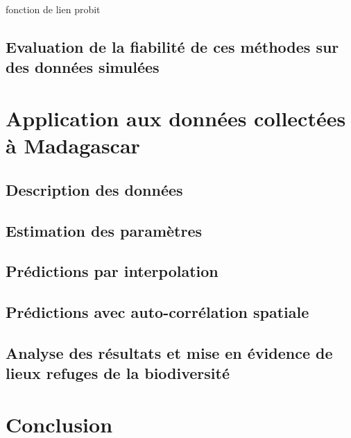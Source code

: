 \documentclass[10pt,]{article}
\begin{document}
fonction de lien probit

\hypertarget{evaluation-de-la-fiabilite-de-ces-methodes-sur-des-donnees-simulees}{%
\subsection{Evaluation de la fiabilité de ces méthodes sur des données
simulées}\label{evaluation-de-la-fiabilite-de-ces-methodes-sur-des-donnees-simulees}}

\hypertarget{application-aux-donnees-collectees-a-madagascar}{%
\section{Application aux données collectées à
Madagascar}\label{application-aux-donnees-collectees-a-madagascar}}

\hypertarget{description-des-donnees}{%
\subsection{Description des données}\label{description-des-donnees}}

\hypertarget{estimation-des-parametres}{%
\subsection{Estimation des paramètres}\label{estimation-des-parametres}}

\hypertarget{predictions-par-interpolation}{%
\subsection{Prédictions par
interpolation}\label{predictions-par-interpolation}}

\hypertarget{predictions-avec-auto-correlation-spatiale}{%
\subsection{Prédictions avec auto-corrélation
spatiale}\label{predictions-avec-auto-correlation-spatiale}}

\hypertarget{analyse-des-resultats-et-mise-en-evidence-de-lieux-refuges-de-la-biodiversite}{%
\subsection{Analyse des résultats et mise en évidence de lieux refuges
de la
biodiversité}\label{analyse-des-resultats-et-mise-en-evidence-de-lieux-refuges-de-la-biodiversite}}

\hypertarget{conclusion}{%
\section{Conclusion}\label{conclusion}}
\end{document}
